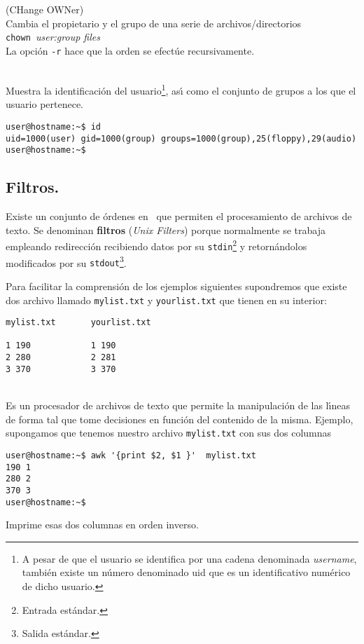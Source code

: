 \noindent
{} (CHange OWNer)\\
Cambia el propietario y el grupo de una serie de archivos/directorios\\
{\verb+chown +}{\it user:group files}\\
La opci{\'o}n {\verb=-r=} hace que la orden se efect{\'u}e recursivamente. 


\noindent
{}\\
Muestra la identificaci{\'o}n del usuario\footnote{A pesar de que el
  usuario se identifica por una cadena denominada {\it username},
  tambi{\'e}n existe un n{\'u}mero denominado {\sc uid} que es un
  identificativo num{\'e}rico de dicho usuario.}, as{\'\i} como el conjunto de
grupos a los que el usuario pertenece.
\begin{verbatim}
user@hostname:~$ id
uid=1000(user) gid=1000(group) groups=1000(group),25(floppy),29(audio)
user@hostname:~$
\end{verbatim}


\subsection{Filtros.}

Existe un conjunto de {\'o}rdenes en \unix\ que permiten el procesamiento
de archivos de texto. Se denominan {\bf filtros} ({\it Unix Filters})
porque normalmente se trabaja empleando redirecci{\'o}n recibiendo datos
por su {\verb+stdin+}\footnote{Entrada est{\'a}ndar.} y retorn{\'a}ndolos
modificados por su {\verb+stdout+}\footnote{Salida est{\'a}ndar.}.

Para facilitar la comprensi{\'o}n de los ejemplos siguientes supondremos
que existe dos archivo llamado \verb+mylist.txt+ y \verb+yourlist.txt+
que tienen en su interior:
\begin{verbatim}
mylist.txt       yourlist.txt

1 190            1 190
2 280            2 281
3 370            3 370
\end{verbatim}

\noindent
{} \\
Es un procesador de archivos de texto que permite la manipulaci{\'o}n de
las l{\'\i}neas de forma tal que tome decisiones en funci{\'o}n del contenido
de la misma. Ejemplo, supongamos que tenemos nuestro archivo
{\verb+mylist.txt+} con sus dos columnas
\begin{verbatim}
user@hostname:~$ awk '{print $2, $1 }'  mylist.txt
190 1
280 2
370 3
user@hostname:~$
\end{verbatim} 
Imprime esas dos columnas en orden inverso.
 
